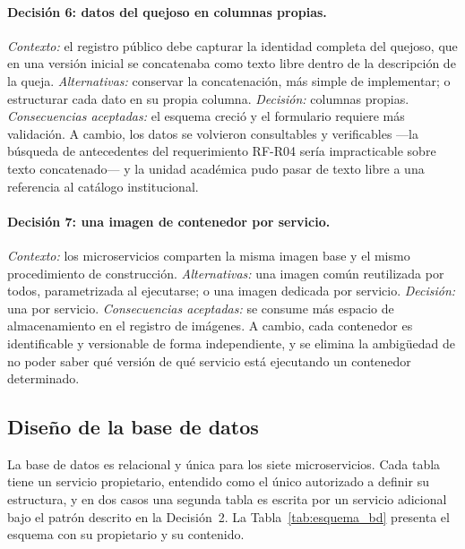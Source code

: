 	\paragraph{Decisión 6: datos del quejoso en columnas propias.}
	\emph{Contexto:} el registro público debe capturar la identidad completa del quejoso, que en una
	versión inicial se concatenaba como texto libre dentro de la descripción de la queja.
	\emph{Alternativas:} conservar la concatenación, más simple de implementar; o estructurar cada
	dato en su propia columna. \emph{Decisión:} columnas propias. \emph{Consecuencias aceptadas:} el
	esquema creció y el formulario requiere más validación. A cambio, los datos se volvieron
	consultables y verificables ---la búsqueda de antecedentes del requerimiento RF-R04 sería
	impracticable sobre texto concatenado--- y la unidad académica pudo pasar de texto libre a una
	referencia al catálogo institucional.
	
	\paragraph{Decisión 7: una imagen de contenedor por servicio.}
	\emph{Contexto:} los microservicios comparten la misma imagen base y el mismo procedimiento de
	construcción. \emph{Alternativas:} una imagen común reutilizada por todos, parametrizada al
	ejecutarse; o una imagen dedicada por servicio. \emph{Decisión:} una por servicio.
	\emph{Consecuencias aceptadas:} se consume más espacio de almacenamiento en el registro de
	imágenes. A cambio, cada contenedor es identificable y versionable de forma independiente, y se
	elimina la ambigüedad de no poder saber qué versión de qué servicio está ejecutando un
	contenedor determinado.
	
	\subsection{Diseño de la base de datos}
	\label{sec:diseno_bd}
	La base de datos es relacional y única para los siete microservicios. Cada tabla tiene un
	servicio propietario, entendido como el único autorizado a definir su estructura, y en dos casos
	una segunda tabla es escrita por un servicio adicional bajo el patrón descrito en la Decisión~2.
	La Tabla~\ref{tab:esquema_bd} presenta el esquema con su propietario y su contenido.
	
	
	\small
	\renewcommand{\arraystretch}{1.25}
	\setlength{\tabcolsep}{4pt}
	
